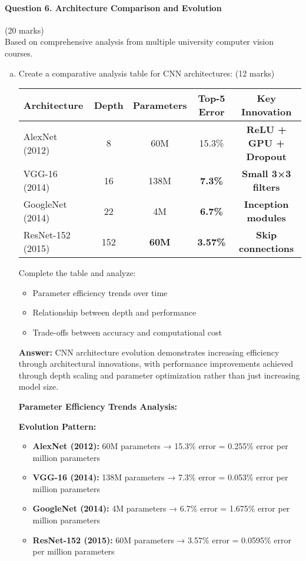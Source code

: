 \documentclass[12pt]{article}
\newcommand{\answer}[1]{{\color{answercolor}\textbf{Answer:} #1}}
\newcommand{\explanation}[1]{{\color{explanationcolor}#1}}
\begin{document}
\newpage
\paragraph{Question 6. Architecture Comparison and Evolution}{\hfill (20 marks)}\\
Based on comprehensive analysis from multiple university computer vision courses.

\begin{enumerate}[(a)]
    \item Create a comparative analysis table for CNN architectures: \hfill (12 marks)
    
    \begin{center}
    \begin{tabular}{|l|c|c|c|c|}
    \hline
    Architecture & Depth & Parameters & Top-5 Error & Key Innovation \\
    \hline
    AlexNet (2012) & 8 & 60M & 15.3\% & \textbf{ReLU + GPU + Dropout} \\
    VGG-16 (2014) & 16 & 138M & \textbf{7.3\%} & \textbf{Small 3×3 filters} \\
    GoogleNet (2014) & 22 & 4M & \textbf{6.7\%} & \textbf{Inception modules} \\
    ResNet-152 (2015) & 152 & \textbf{60M} & \textbf{3.57\%} & \textbf{Skip connections} \\
    \hline
    \end{tabular}
    \end{center}
    
    Complete the table and analyze:
    \begin{itemize}
        \item Parameter efficiency trends over time
        \item Relationship between depth and performance
        \item Trade-offs between accuracy and computational cost
    \end{itemize}
    
    \answer{CNN architecture evolution demonstrates increasing efficiency through architectural innovations, with performance improvements achieved through depth scaling and parameter optimization rather than just increasing model size.}
    
    \explanation{
    \textbf{Parameter Efficiency Trends Analysis:}
    
    \textbf{Evolution Pattern:}
    \begin{itemize}
        \item \textbf{AlexNet (2012):} 60M parameters → 15.3\% error = 0.255\% error per million parameters
        \item \textbf{VGG-16 (2014):} 138M parameters → 7.3\% error = 0.053\% error per million parameters  
        \item \textbf{GoogleNet (2014):} 4M parameters → 6.7\% error = 1.675\% error per million parameters
        \item \textbf{ResNet-152 (2015):} 60M parameters → 3.57\% error = 0.0595\% error per million parameters
    \end{itemize}
    
}
\end{enumerate}
\end{document}
